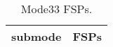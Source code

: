 \begin{table}[h!]
\begin{center}
\begin{tabular}{cl}
\hline
submode& FSPs\\
\hline
\hline
\end{tabular}
\label{tab:Mode33FSPs}
\caption{Mode33 FSPs.}
\end{center}
\end{table}
